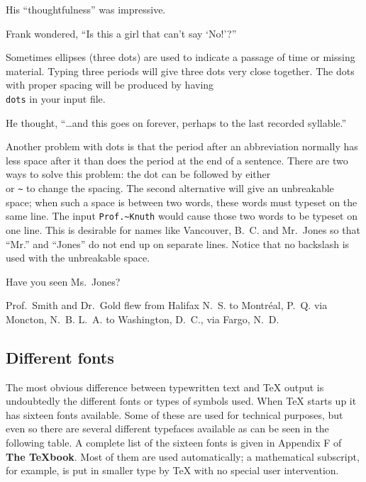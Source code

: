 \exercise His ``thoughtfulness'' was impressive. 
 
\exercise Frank wondered, ``Is this a girl that can't say `No!'?'' 
\bigskip 
 
Sometimes ellipses (three dots) are used to indicate a passage 
of time or missing material.  Typing three periods will give 
three dots very close together. The dots with proper spacing will 
be produced by having {\tt \\dots} in your input file. 
 
\exercise He thought, ``\dots and this goes on forever, perhaps to the 
last recorded syllable.'' 
 
Another problem with dots is that the period after an 
abbreviation normally has less space after it than does the 
period at the end of a sentence. There are two ways to solve this 
problem: the dot can be followed by either {\tt\\\sp} or {\tt\~{}} 
to change the spacing. 
The second alternative will give an unbreakable space; when such 
a space is between two words, these words must typeset on the 
same line. The input {\tt Prof.\~{}Knuth} would cause those two 
words to be typeset on one line.  This is desirable for names 
like Vancouver, B.~C. and Mr.~Jones so that ``Mr.'' and ``Jones'' 
do not end up on separate lines. Notice that no backslash is used 
with the unbreakable space. 
 
\exercise Have you seen Ms.~Jones? 
 
\exercise Prof.~Smith and Dr.~Gold flew from 
\ifcanspell 
Halifax N.~S. to Montr\'eal, P.~Q. via Moncton, N.~B. 
\else 
L.~A. to Washington, D.~C., via Fargo, N.~D. 
\fi 
 
 
\subsection{Different fonts} 
 
The most obvious difference between typewritten text and \TeX{} 
output is undoubtedly the different fonts or types of symbols 
used. When \TeX{} starts up it has sixteen fonts available.  Some 
of these are used for technical purposes, but even so there are 
several different typefaces available as can be seen in the 
following table. A complete list of the sixteen fonts is given in 
Appendix F of {\bf The \TeX{}book}. 
Most of them are used automatically; a mathematical subscript, 
for example, is put in smaller type by \TeX{} with no special 
user intervention. 
 
